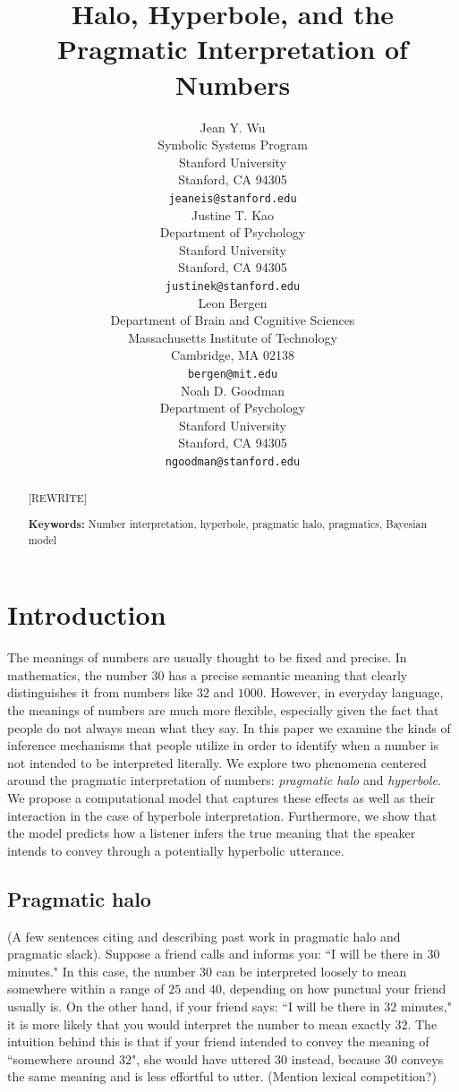 \documentclass{article} %
\title{Halo, Hyperbole, and the Pragmatic Interpretation of Numbers}
\author{
Jean Y. Wu \\
Symbolic Systems Program\\
Stanford University\\
Stanford, CA 94305 \\
\texttt{jeaneis@stanford.edu} \\
\And
Justine T. Kao \\
Department of Psychology\\
Stanford University \\
Stanford, CA 94305 \\
\texttt{justinek@stanford.edu} \\
\AND
Leon Bergen \\
Department of Brain and Cognitive Sciences\\
Massachusetts Institute of Technology \\
Cambridge, MA 02138\\
\texttt{bergen@mit.edu} \\
\And
Noah D. Goodman \\
Department of Psychology\\
Stanford University \\ 
Stanford, CA 94305\\
\texttt{ngoodman@stanford.edu} \\
}
\begin{document}
\maketitle

\begin{abstract}
[REWRITE] 

\textbf{Keywords:} 
Number interpretation, hyperbole, pragmatic halo, pragmatics, Bayesian model
\end{abstract}


\section{Introduction}

The meanings of numbers are usually thought to be fixed and precise. In mathematics, the number $30$ has a precise semantic meaning that clearly distinguishes it from numbers like $32$ and $1000$. However, in everyday language, the meanings of numbers are much more flexible, especially given the fact that people do not always mean what they say. In this paper we examine the kinds of inference mechanisms that people utilize in order to identify when a number is not intended to be interpreted literally. We explore two phenomena centered around the pragmatic interpretation of numbers: \emph{pragmatic halo} and \emph{hyperbole.} We propose a computational model that captures these effects as well as their interaction in the case of hyperbole interpretation. Furthermore, we show that the model predicts how a listener infers the true meaning that the speaker intends to convey through a potentially hyperbolic utterance. 

\subsection{Pragmatic halo}

(A few sentences citing and describing past work in pragmatic halo and pragmatic slack). Suppose a friend calls and informs you: ``I will be there in $30$ minutes." In this case, the number $30$ can be interpreted loosely to mean somewhere within a range of $25$ and $40$, depending on how punctual your friend usually is. On the other hand, if your friend says: ``I will be there in $32$ minutes," it is more likely that you would interpret the number to mean exactly $32$. The intuition behind this is that if your friend intended to convey the meaning of ``somewhere around $32$", she would have uttered $30$ instead, because $30$ conveys the same meaning and is less effortful to utter. (Mention lexical competition?)
\end{document}
